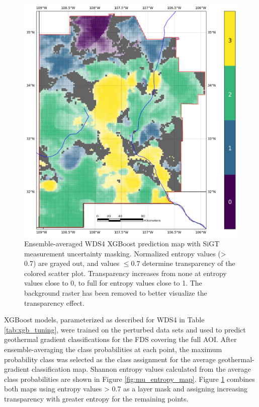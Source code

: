 \begin{figure}
\centering
\includegraphics[width=.75\textwidth]{templates/images/Figure-MU_Masked_Average_Gradient_Map.png}
\caption[SiGT measurement uncertainty mask on prediction map]
{Ensemble-averaged WDS4 XGBoost prediction map with SiGT measurement uncertainty masking. Normalized entropy values (> 0.7) are grayed out, and values $\leq0.7$ determine transparency of the colored scatter plot. Transparency increases from none at entropy values close to 0, to full for entropy values close to 1. The background raster has been removed to better visualize the transparency effect.}
\label{fig:mu_masked_pred_map}
\end{figure}

XGBoost models, parameterized as described for WDS4 in Table \ref{tab:xgb_tuning}, were trained on the perturbed data sets and used to predict geothermal gradient classifications for the FDS covering the full AOI. After ensemble-averaging the class probabilities at each point, the maximum probability class was selected as the class assignment for the average geothermal-gradient classification map. Shannon entropy values calculated from the average class probabilities are shown in Figure \ref{fig:mu_entropy_map}. Figure \ref{fig:mu_masked_pred_map} combines both maps using entropy values > 0.7 as a layer mask and assigning increasing transparency with greater entropy for the remaining points.

